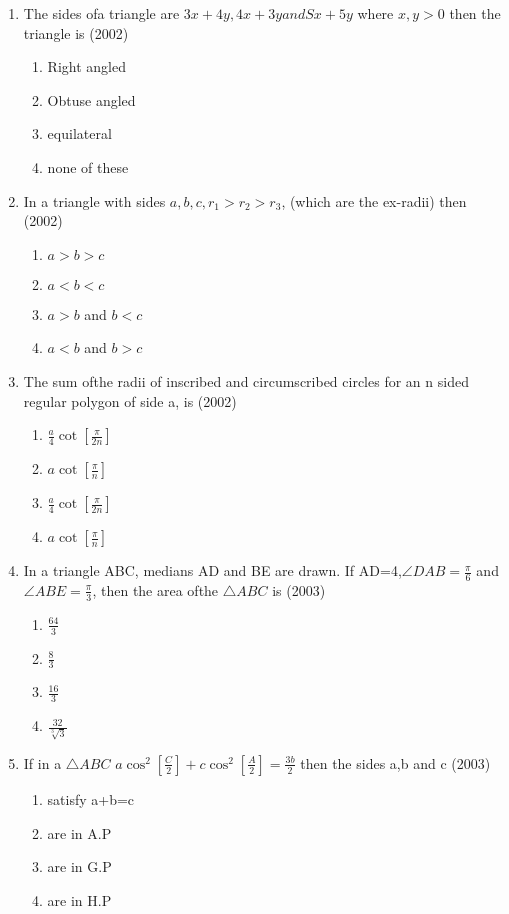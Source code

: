 \documentclass[12pt]{article}
\providecommand{\sbrak}[1]{\ensuremath{{}\left[#1\right]}}
\begin{document}
\begin{enumerate}
\begin{enumerate}
\item The sides ofa triangle are $3x+4y, 4x+3y and Sx+5y$ where $x,y>0$ then the triangle is (2002)
\begin{enumerate}
\item Right angled 
\item Obtuse angled 
\item equilateral
\item none of these
\end{enumerate}
\item In a triangle with sides $a,b,c,r_1>r_2>r_3$, (which are the ex-radii) then (2002)
\begin{enumerate}
\item $a>b>c$
\item $a<b<c$
\item $a>b$ and $b<c$
\item $a<b$ and $b>c$
\end{enumerate}
\item The sum ofthe radii of inscribed and circumscribed circles for an n sided regular polygon of side a, is (2002)
\begin{enumerate}
\item $\frac{a}{4}\cot\sbrak{\frac{\pi}{2n}}$
\item $a\cot\sbrak{\frac{\pi}{n}}$
\item $\frac{a}{4}\cot\sbrak{\frac{\pi}{2n}}$
\item $a\cot\sbrak{\frac{\pi}{n}}$
\end{enumerate}
\item In a triangle ABC, medians AD and BE are drawn. If AD=4,$\angle DAB=\frac{\pi}{6}$ and $\angle ABE=\frac{\pi}{3}$, then the area ofthe $\triangle ABC$ is (2003)
\begin{enumerate}
\item $\frac{64}{3}$
\item $\frac{8}{3}$
\item $\frac{16}{3}$
\item $\frac{32}{\sqrt[3]{3}}$
\end{enumerate}
\item If in a $\triangle ABC$ $a\cos^2\sbrak{\frac{C}{2}}+c\cos^2\sbrak{\frac{A}{2}}=\frac{3b}{2}$ then the sides a,b and c (2003)
\begin{enumerate}
\item satisfy a+b=c
\item are in A.P
\item are in G.P
\item are in H.P

\end{enumerate}
\end{enumerate}
\end{enumerate}
\end{document}
